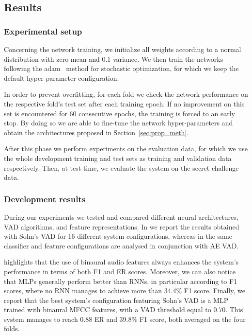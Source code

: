 \subsection{Results}
\subsubsection{Experimental setup}

Concerning the network training, we initialize all weights according to a normal distribution with zero mean and 0.1 variance. We then train the networks following the adam~\cite{kingma2014adam} method for stochastic optimization, for which we keep the default hyper-parameter configuration.

In order to prevent overfitting, for each fold we check the network performance on the respective fold's test set after each training epoch. If no improvement on this set is encountered for 60 consecutive epochs, the training is forced to an early stop. By doing so we are able to fine-tune the network hyper-parameters and obtain the architectures proposed in Section~\ref{sec:prop_meth}. 

After this phase we perform experiments on the evaluation data, for which we use the whole development training and test sets as training and validation data respectively. Then, at test time, we evaluate the system on the secret challenge data.

\subsubsection{Development results}

During our experiments we tested and compared different neural architectures, VAD algorithms, and feature representations. In  we report the results obtained with Sohn's VAD for 16 different system configurations, whereas in  the same classifier and feature configurations are analysed in conjunction with AE VAD.

 highlights that the use of binaural audio features always enhances the system's performance in terms of both F1 and ER scores. Moreover, we can also notice that MLPs generally perform better than RNNs, in particular according to F1 scores, where no RNN manages to achieve more than 34.4\% F1 score. Finally, we report that the best system's configuration featuring Sohn's VAD is a MLP trained with binaural MFCC features, with a VAD threshold equal to 0.70. This system manages to reach 0.88 ER and 39.8\% F1 score, both averaged on the four folds.

